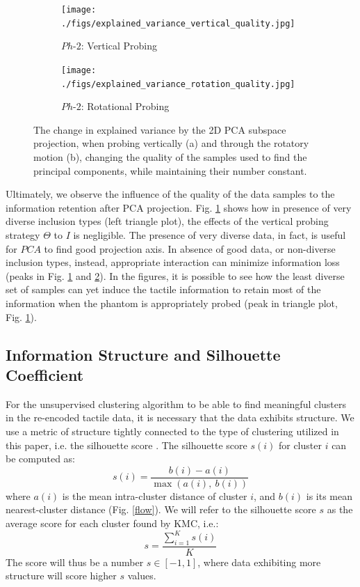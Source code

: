 \documentclass[]{interact}
\theoremstyle{plain}%
\theoremstyle{definition}
\theoremstyle{remark}
\begin{document}
\begin{figure}[]
	\centering
	\begin{subfigure}[b]{.48\textwidth}
		\texttt{[image: ./figs/explained\_variance\_vertical\_quality.jpg]}
		\caption{\tiny{$Ph\text{-}2$: Vertical Probing}}
		\label{inf_retention_quality:vertical}
	\end{subfigure}
	\begin{subfigure}[b]{.48\textwidth}
		\texttt{[image: ./figs/explained\_variance\_rotation\_quality.jpg]}
		\caption{\tiny{$Ph\text{-}2$: Rotational Probing}}
		\label{inf_retention_quality:Rotation}
	\end{subfigure}
	\caption{The change in explained variance by the 2D PCA subspace projection, 
		when probing vertically (a) and through the rotatory motion (b), changing the quality of 
		the samples used to find the principal components, while maintaining their number constant. }
	\label{inf_retention_quality}
\end{figure}

Ultimately, we observe the influence of the quality of the data samples to the information retention after 
PCA projection. Fig. \ref{inf_retention_quality:vertical} shows how in presence of very diverse inclusion types 
(left triangle plot), the effects of the vertical probing strategy $\Theta$ to $I$ is negligible. The presence of 
very diverse data, in fact, is useful for $PCA$ to find good projection axis. 
In absence of good data, or non-diverse inclusion types, instead, appropriate interaction can minimize 
information loss (peaks in Fig. \ref{inf_retention_quality:vertical} and \ref{inf_retention_quality:Rotation}).
In the figures, it is possible to see how the least diverse set of samples can yet induce 
the tactile information to retain most of the information when  the phantom is appropriately probed 
(peak in triangle plot, Fig. \ref{inf_retention_quality:vertical}).


\subsection{Information Structure and Silhouette Coefficient}


For the unsupervised clustering algorithm to be able to find meaningful clusters in the re-encoded tactile data,
it is necessary that the data exhibits structure. We use a metric of structure tightly connected 
to the type of clustering utilized in this paper, i.e. the silhouette score \cite{rousseeuw1987silhouettes}. 
The silhouette score $s(i)$ for cluster $i$ can be computed as:
\begin{equation}
		s(i) = \frac{b(i)-a(i)}{\operatorname{max} (a(i),\ b(i))}
\end{equation}
where $a(i)$ is the mean intra-cluster distance of cluster $i$, and $b(i)$ is its mean nearest-cluster distance (Fig. \ref{flow}). 
We will refer to the silhouette score $s$ as the average score for each cluster found by KMC, i.e.: 
\begin{equation}
	s = \frac{\sum_{i=1}^{K} s(i)}{K}
\end{equation}
The score will thus be a number $s \in [-1,1]$, where data exhibiting more structure will score higher $s$ values. 
\end{document}
